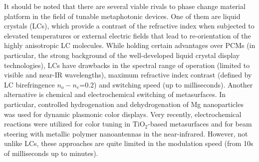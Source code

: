 \documentclass[journal=chreay,manuscript=review]{achemso}
\begin{document}
It should be noted that there are several viable rivals to phase change material platform in the field of tunable metaphotonic devices. One of them are liquid crystals (LCs), which provide a contrast of the refractive index when subjected to elevated temperatures\cite{komar2018dynamic} or external electric fields\cite{komar2017electrically} that lead to re-orientation of the highly anisotropic LC molecules. While holding certain advantages over PCMs (in particular, the strong background of the well-developed liquid crystal display technologies\cite{li2019phase}), LCs have drawbacks in the spectral range of operation (limited to visible and near-IR wavelengths), maximum refractive index contrast (defined by LC birefringence $n_o-n_e$=0.2) and switching speed (up to milliseconds). Another alternative is chemical and electrochemical switching of metasurfaces. In particular, controlled hydrogenation and dehydrogenation of Mg nanoparticles was used for dynamic plasmonic color displays\cite{Duan2017dynamic}. Very recently, electrochemical reactions were utilized for color tuning in TiO$_2$-based metasurfaces\cite{eaves2022dynamic} and for beam steering with metallic polymer nanoantennas in the near-infrared\cite{karst2021electrically}. However, not unlike LCs, these approaches are quite limited in the modulation speed (from 10s of milliseconds\cite{karst2021electrically} up to minutes\cite{Duan2017dynamic,eaves2022dynamic}).
\end{document}
